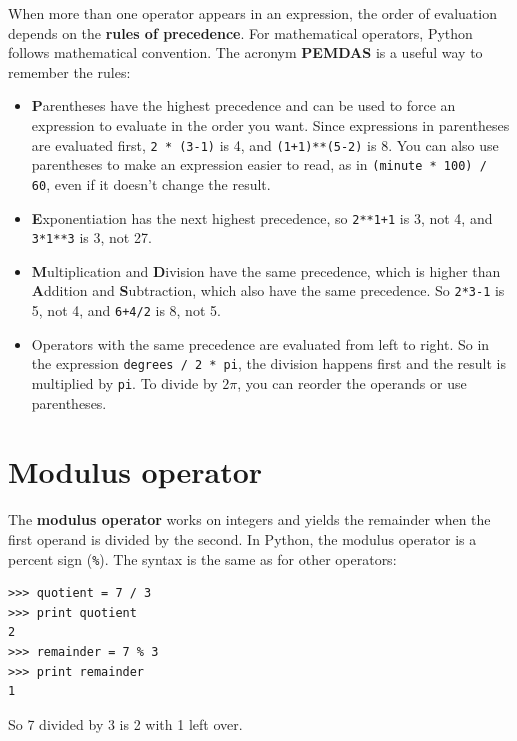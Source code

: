 \documentclass[10pt]{book}
\begin{document}
When more than one operator appears in an expression, the order of
evaluation depends on the {\bf rules of precedence}.  For
mathematical operators, Python follows mathematical convention.
The acronym {\bf PEMDAS} is a useful way to
remember the rules:


\begin{itemize}

\item {\bf P}arentheses have the highest precedence and can be used 
to force an expression to evaluate in the order you want. Since
expressions in parentheses are evaluated first, {\tt 2 * (3-1)} is 4,
and {\tt (1+1)**(5-2)} is 8. You can also use parentheses to make an
expression easier to read, as in {\tt (minute * 100) / 60}, even
if it doesn't change the result.

\item {\bf E}xponentiation has the next highest precedence, so
{\tt 2**1+1} is 3, not 4, and {\tt 3*1**3} is 3, not 27.

\item {\bf M}ultiplication and {\bf D}ivision have the same precedence,
which is higher than {\bf A}ddition and {\bf S}ubtraction, which also
have the same precedence.  So {\tt 2*3-1} is 5, not 4, and
{\tt 6+4/2} is 8, not 5.

\item Operators with the same precedence are evaluated from left to 
right.  So in the expression {\tt degrees / 2 * pi}, the division
happens first and the result is multiplied by {\tt pi}.  
To divide by $2 \pi$, you can reorder the operands or use parentheses.

\end{itemize}

\section{Modulus operator}


The {\bf modulus operator} works on integers and yields the remainder
when the first operand is divided by the second.  In Python, the
modulus operator is a percent sign (\verb"%").  The syntax is the same
as for other operators:

\beforeverb
\begin{verbatim}
>>> quotient = 7 / 3
>>> print quotient
2
>>> remainder = 7 % 3
>>> print remainder
1
\end{verbatim}
\afterverb
%
So 7 divided by 3 is 2 with 1 left over.
\end{document}
